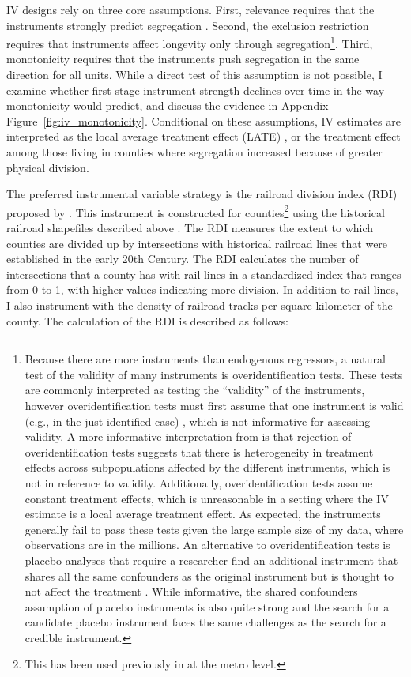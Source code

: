 \documentclass[11pt]{article}
\begin{document}
IV designs rely on three core assumptions. First, relevance requires that the instruments strongly predict segregation \citep{angrist_one_2021}. Second, the exclusion restriction requires that instruments affect longevity only through segregation\footnote{Because there are more instruments than endogenous regressors, a natural test of the validity of many instruments is overidentification tests. These tests are commonly interpreted as testing the ``validity'' of the instruments, however overidentification tests must first assume that one instrument is valid (e.g., in the just-identified case) \citep{felton_handle_2024}, which is not informative for assessing validity. A more informative interpretation from \citet{mogstad_causal_2021} is that rejection of overidentification tests suggests that there is heterogeneity in treatment effects across subpopulations affected by the different instruments, which is not in reference to validity. Additionally, overidentification tests assume constant treatment effects, which is unreasonable in a setting where the IV estimate is a local average treatment effect. As expected, the instruments generally fail to pass these tests given the large sample size of my data, where observations are in the millions. An alternative to overidentification tests is placebo analyses that require a researcher find an additional instrument that shares all the same confounders as the original instrument but is thought to not affect the treatment \citep{felton_handle_2024}. While informative, the shared confounders assumption of placebo instruments is also quite strong and the search for a candidate placebo instrument faces the same challenges as the search for a credible instrument.}. Third, monotonicity requires that the instruments push segregation in the same direction for all units. While a direct test of this assumption is not possible, I examine whether first-stage instrument strength declines over time in the way monotonicity would predict, and discuss the evidence in Appendix Figure~\ref{fig:iv_monotonicity}. Conditional on these assumptions, IV estimates are interpreted as the local average treatment effect (LATE) \citep{imbens_identification_1994}, or the treatment effect among those living in counties where segregation increased because of greater physical division.

The preferred instrumental variable strategy is the railroad division index (RDI) proposed by \citet{ananat_wrong_2011}. This instrument is constructed for counties\footnote{This has been used previously in \citet{quillian_does_2014,ananat_segregation_2009,chyn_effects_2026} at the metro level.} using the historical railroad shapefiles described above \citep{atack_historical_2016}. The RDI measures the extent to which counties are divided up by intersections with historical railroad lines that were established in the early 20th Century. The RDI calculates the number of intersections that a county has with rail lines in a standardized index that ranges from 0 to 1, with higher values indicating more division. In addition to rail lines, I also instrument with the density of railroad tracks per square kilometer of the county. The calculation of the RDI is described as follows: 
\end{document}
